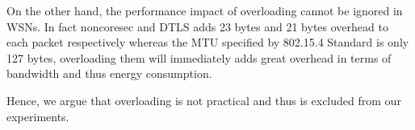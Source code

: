 On the other hand, the performance impact of overloading cannot be ignored in WSNs. In fact noncoresec and DTLS adds 23 bytes and 21 bytes overhead to each packet respectively whereas the MTU specified by 802.15.4 Standard is only 127 bytes, overloading them will immediately adds great overhead in terms of bandwidth and thus energy consumption. 

Hence, we argue that overloading is not practical and thus is excluded from our experiments.
%
%
%
%
%	
%	
%	
%	
